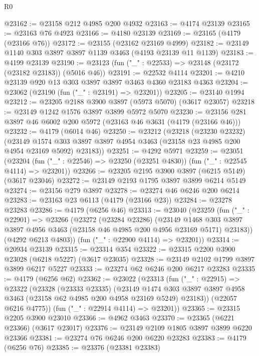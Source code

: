 \begin{lexlean}{R0}
\begin{coremodule}
@23162 := @23158 @212 @4985 @200 @4932
@23163 := @4174 @23139
@23165 := @23163 @76 @4923
@23166 := @4180 @23139
@23169 := @23165 (@4179 (@23166 @76))
@23172 := @23155 (@23162 @23169 @4999)
@23182 := @23149 @1140 @303 @3897 @3897 @1139 @3463 (@4193 @23139 @11 @1139)
@23183 := @4199 @23139
@23190 := @23123 (fun ("_" : @22533) => @23148 (@23172 (@23182 @23183)) (@5016 @46))
@23191 := @22532 @4114
@23201 := @4210 @23139 @920 @13 @303 @3897 @3897 @3463 @4360 @23183 @4363
@23204 := @23062 (@23190 (fun ("_" : @23191) => @23201))
@23205 := @23140 @1994
@23212 := @23205 @2188 @3900 @3897 (@5973 @5070) (@3617 @23057)
@23218 := @23149 @1242 @1576 @3897 @3899 @5972 @5070
@23230 := @23156 @281 @3897 @46 @6002 @200 @5972 (@23163 @46 @3631 (@4179 (@23166 @46)))
@23232 := @4179 (@6014 @46)
@23250 := @23212
    (@23218
      (@23230 @23232)
      (@23149 @1574 @303 @3897 @3897 @4954 @3463 (@23158 @23 @4985 @200 @4954 @23169 @5092) @23183))
@23251 := @4292 @5971
@23259 := @23051
    (@23204 (fun ("_" : @22546) => @23250 (@23251 @4830)) (fun ("_" : @22545 @4114) => @23201))
@23266 := @23205 @2195 @3900 @3897 (@6215 @5149) (@3617 @23046)
@23272 := @23149 @2193 @1795 @3897 @3899 @6214 @5149
@23274 := @23156 @279 @3897
@23278 := @23274 @46 @6246 @200 @6214
@23283 := @23163 @23 @6113 (@4179 (@23166 @23))
@23284 := @23278 @23283
@23286 := @4179 (@6256 @46)
@23313 := @23040
    (@23259
      (fun ("_" : @22901) =>
      @23266
        (@23272
          (@23284 @23286)
          (@23149
            @1468
            @303
            @3897
            @3897
            @4956
            @3463
            (@23158 @46 @4985 @200 @4956 @23169 @5171)
            @23183))
        (@4292 @6213 @4803))
      (fun ("_" : @22900 @4114) => @23201))
@23314 := @20934 @23139
@23315 := @23314 @354
@23322 := @23315 @2200 @3900 @23028 (@6218 @5227) (@3617 @23035)
@23328 := @23149 @2102 @1799 @3897 @3899 @6217 @5227
@23333 := @23274 @62 @6246 @200 @6217 @23283
@23335 := @4179 (@6256 @62)
@23362 := @23022
    (@23313
      (fun ("_" : @22915) =>
      @23322
        (@23328
          (@23333 @23335)
          (@23149
            @1474
            @303
            @3897
            @3897
            @4958
            @3463
            (@23158 @62 @4985 @200 @4958 @23169 @5249)
            @23183))
        (@22057 @6216 @4775))
      (fun ("_" : @22914 @4114) => @23201))
@23365 := @23315 @2205 @3900 @23010
@23366 := @4962 @3463
@23370 := @23365 (@6221 @23366) (@3617 @23017)
@23376 := @23149 @2109 @1805 @3897 @3899 @6220 @23366
@23381 := @23274 @76 @6246 @200 @6220 @23283
@23383 := @4179 (@6256 @76)
@23385 := @23376 (@23381 @23383)

\end{coremodule}
\end{lexlean}
